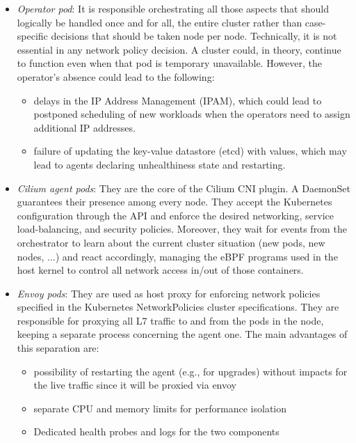 \begin{itemize}
  \itemsep0em
  \item \textit{Operator pod}: It is responsible orchestrating all those
    aspects that should logically be handled once and for all, the entire cluster
    rather than case-specific decisions that should be taken node per node.
    Technically, it is not essential in any network policy decision. A cluster
    could, in theory, continue to function even when that pod is temporary
    unavailable. However, the operator's absence could lead to the following:
    \begin{itemize}
      \itemsep0em
      \item delays in the IP Address Management (IPAM), which could lead to
        postponed scheduling of new workloads when the operators need to assign
        additional IP addresses.
      \item failure of updating the key-value datastore (etcd) with values,
        which may lead to agents declaring unhealthiness state and restarting.
    \end{itemize}
  \item \textit{Cilium agent pods}: They are the core of the Cilium CNI plugin.
    A DaemonSet guarantees their presence among every node. They accept the
    Kubernetes configuration through the API and enforce the desired networking,
    service load-balancing, and security policies.
    Moreover, they wait for events from the orchestrator to learn about the
    current cluster situation (new pods, new nodes, ...) and react accordingly,
    managing the eBPF programs used in the host kernel to control all network
    access in/out of those containers.
  \item \textit{Envoy pods}: They are used as host proxy for enforcing network
    policies specified in the Kubernetes NetworkPolicies cluster specifications.
    They are responsible for proxying all L7 traffic to and from the pods in the
    node, keeping a separate process concerning the agent one.
    The main advantages of this separation are:
    \begin{itemize}
      \itemsep0em
      \item possibility of restarting the agent (e.g., for upgrades) without
        impacts for the live traffic since it will be proxied via envoy
      \item separate CPU and memory limits for performance isolation
      \item Dedicated health probes and logs for the two components
    \end{itemize}
\end{itemize}

